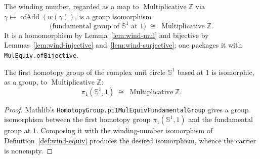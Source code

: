 \begin{definition}
    \label{def:wind-equiv}
    \leanok
    The winding number, regarded as a map to \(\operatorname{Multiplicative}\mathbb{Z}\) via
    \(\gamma \mapsto \operatorname{ofAdd}(w(\gamma))\), is a group isomorphism
    \[
      \text{(fundamental group of } \mathbb{S}^1 \text{ at } 1) \;\cong\; \operatorname{Multiplicative}\mathbb{Z}.
    \]
    It is a homomorphism by Lemma~\ref{lem:wind-mul} and bijective by
    Lemmas~\ref{lem:wind-injective} and~\ref{lem:wind-surjective}; one packages it with
    \texttt{MulEquiv.ofBijective}.
\end{definition}

\begin{theorem}
    \label{thm:pi1-circle}
    \leanok
    The first homotopy group of the complex unit circle \(\mathbb{S}^1\) based at \(1\) is
    isomorphic, as a group, to \(\operatorname{Multiplicative}\mathbb{Z}\):
    \[
      \pi_1(\mathbb{S}^1, 1) \;\cong\; \operatorname{Multiplicative}\mathbb{Z}.
    \]
\end{theorem}
\begin{proof}
    Mathlib's \texttt{HomotopyGroup.pi1MulEquivFundamentalGroup} gives a group isomorphism
    between the first homotopy group \(\pi_1(\mathbb{S}^1, 1)\) and the fundamental group at
    \(1\). Composing it with the winding-number isomorphism of
    Definition~\ref{def:wind-equiv} produces the desired isomorphism, whence the carrier is
    nonempty.
\end{proof}


